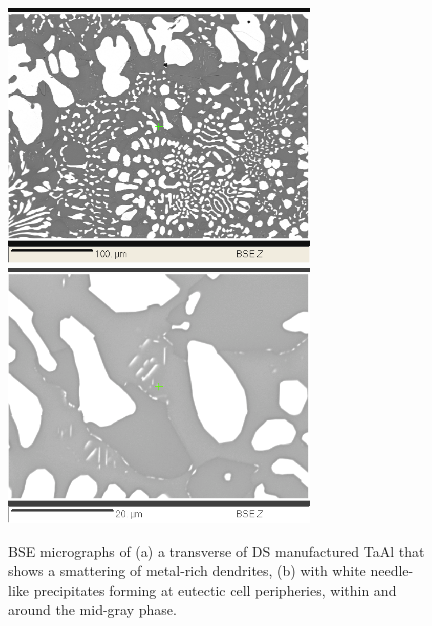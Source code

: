 %
\begin{figure}[htbp]
\begin{center}
\includegraphics[width=8cm]{auto7_ii}
\includegraphics[width=8cm]{auto6_needle}
\caption{BSE micrographs of (a) a transverse of DS manufactured TaAl that shows a smattering of metal-rich dendrites, (b) with white needle-like precipitates forming at eutectic cell peripheries, within and around the mid-gray phase.}
\label{fig:auto7}
\end{center}
\end{figure}
%

